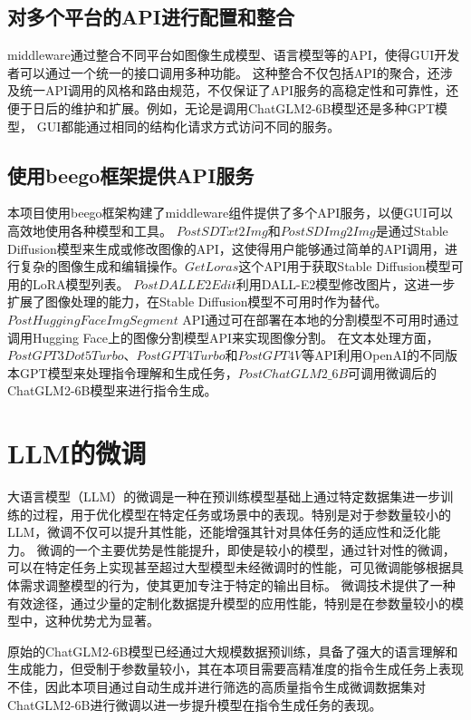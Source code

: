 \documentclass[a4paper,AutoFakeBold,oneside,12pt]{book}
\begin{document}
\subsection{对多个平台的API进行配置和整合}
middleware通过整合不同平台如图像生成模型、语言模型等的API，使得GUI开发者可以通过一个统一的接口调用多种功能。
这种整合不仅包括API的聚合，还涉及统一API调用的风格和路由规范，不仅保证了API服务的高稳定性和可靠性，还便于日后的维护和扩展。例如，无论是调用ChatGLM2-6B模型还是多种GPT模型，
GUI都能通过相同的结构化请求方式访问不同的服务。


\subsection{使用beego框架提供API服务}
本项目使用beego框架构建了middleware组件提供了多个API服务，以便GUI可以高效地使用各种模型和工具。
$PostSDTxt2Img$和$PostSDImg2Img$是通过Stable Diffusion模型来生成或修改图像的API，这使得用户能够通过简单的API调用，进行复杂的图像生成和编辑操作。$GetLoras$这个API用于获取Stable Diffusion模型可用的LoRA模型列表。
$PostDALLE2Edit$利用DALL-E2模型修改图片，这进一步扩展了图像处理的能力，在Stable Diffusion模型不可用时作为替代。
$PostHuggingFaceImgSegment$ API通过可在部署在本地的分割模型不可用时通过调用Hugging Face上的图像分割模型API来实现图像分割。
在文本处理方面，$PostGPT3Dot5Turbo$、$PostGPT4Turbo$和$PostGPT4V$等API利用OpenAI的不同版本GPT模型来处理指令理解和生成任务，$PostChatGLM2\_6B$可调用微调后的ChatGLM2-6B模型来进行指令生成。

\section{LLM的微调} %
大语言模型（LLM）的微调是一种在预训练模型基础上通过特定数据集进一步训练的过程，用于优化模型在特定任务或场景中的表现。特别是对于参数量较小的LLM，微调不仅可以提升其性能，还能增强其针对具体任务的适应性和泛化能力。
微调的一个主要优势是性能提升，即使是较小的模型，通过针对性的微调，可以在特定任务上实现甚至超过大型模型未经微调时的性能，可见微调能够根据具体需求调整模型的行为，使其更加专注于特定的输出目标。
微调技术提供了一种有效途径，通过少量的定制化数据提升模型的应用性能，特别是在参数量较小的模型中，这种优势尤为显著。

原始的ChatGLM2-6B模型已经通过大规模数据预训练，具备了强大的语言理解和生成能力，但受制于参数量较小，其在本项目需要高精准度的指令生成任务上表现不佳，因此本项目通过自动生成并进行筛选的高质量指令生成微调数据集对ChatGLM2-6B进行微调以进一步提升模型在指令生成任务的表现。
\end{document}
